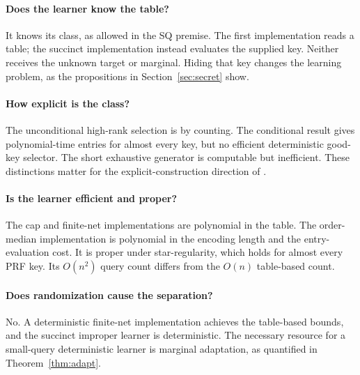 \documentclass[11pt]{article}
\newcommand{\1}{\mathbf 1}
\begin{document}
\paragraph{Does the learner know the table?}
It knows its class, as allowed in the SQ premise. The first implementation reads a table; the succinct implementation instead evaluates the supplied key. Neither receives the unknown target or marginal. Hiding that key changes the learning problem, as the propositions in Section~\ref{sec:secret} show.

\paragraph{How explicit is the class?}
The unconditional high-rank selection is by counting. The conditional result gives polynomial-time entries for almost every key, but no efficient deterministic good-key selector. The short exhaustive generator is computable but inefficient. These distinctions matter for the explicit-construction direction of \citet[Problem~4.1]{HHPTZ22}.

\paragraph{Is the learner efficient and proper?}
The cap and finite-net implementations are polynomial in the table. The order-median implementation is polynomial in the encoding length and the entry-evaluation cost. It is proper under star-regularity, which holds for almost every PRF key. Its $O(n^2)$ query count differs from the $O(n)$ table-based count.

\paragraph{Does randomization cause the separation?}
No. A deterministic finite-net implementation achieves the table-based bounds, and the succinct improper learner is deterministic. The necessary resource for a small-query deterministic learner is marginal adaptation, as quantified in Theorem~\ref{thm:adapt}.



\end{document}
